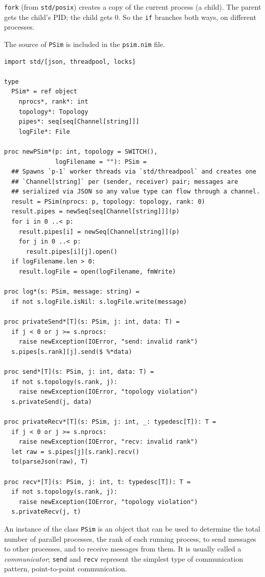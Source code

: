 \documentclass[justified, sixbynine]{tufte-book}
\def\ft{\small\tt}
\theoremstyle{plain}%
\newtheorem * {corollary}{Corollary}
\theoremstyle{definition}
\theoremstyle{remark}
\newtheorem * {remark}{Remark}
\newtheorem * {note}{Note}
\begin{document}
\begin{fullwidth}
{\ft fork} (from {\ft std/posix}) creates a copy of the current process (a child). The parent gets the child's PID; the child gets 0. So the {\ft if} branches both ways, on different processes.

The source of {\ft PSim} is included in the {\ft psim.nim} file.


\begin{lstlisting}[caption={in file: {\ft psim.nim}}]
import std/[json, threadpool, locks]

type
  PSim* = ref object
    nprocs*, rank*: int
    topology*: Topology
    pipes*: seq[seq[Channel[string]]]
    logFile*: File

proc newPSim*(p: int, topology = SWITCH(),
              logFilename = ""): PSim =
  ## Spawns `p-1` worker threads via `std/threadpool` and creates one
  ## `Channel[string]` per (sender, receiver) pair; messages are
  ## serialized via JSON so any value type can flow through a channel.
  result = PSim(nprocs: p, topology: topology, rank: 0)
  result.pipes = newSeq[seq[Channel[string]]](p)
  for i in 0 ..< p:
    result.pipes[i] = newSeq[Channel[string]](p)
    for j in 0 ..< p:
      result.pipes[i][j].open()
  if logFilename.len > 0:
    result.logFile = open(logFilename, fmWrite)

proc log*(s: PSim, message: string) =
  if not s.logFile.isNil: s.logFile.write(message)

proc privateSend*[T](s: PSim, j: int, data: T) =
  if j < 0 or j >= s.nprocs:
    raise newException(IOError, "send: invalid rank")
  s.pipes[s.rank][j].send($ %*data)

proc send*[T](s: PSim, j: int, data: T) =
  if not s.topology(s.rank, j):
    raise newException(IOError, "topology violation")
  s.privateSend(j, data)

proc privateRecv*[T](s: PSim, j: int, _: typedesc[T]): T =
  if j < 0 or j >= s.nprocs:
    raise newException(IOError, "recv: invalid rank")
  let raw = s.pipes[j][s.rank].recv()
  to(parseJson(raw), T)

proc recv*[T](s: PSim, j: int, t: typedesc[T]): T =
  if not s.topology(s.rank, j):
    raise newException(IOError, "topology violation")
  s.privateRecv(j, t)
\end{lstlisting}


An instance of the class {\ft PSim} is an object that can be used to determine the total number of parallel processes, the rank of each running process, to send messages to other processes, and to receive messages from them. It is usually called a {\it communicator}; {\ft send} and {\ft recv} represent the simplest type of communication pattern, point-to-point communication.


\end{fullwidth}
\end{document}

